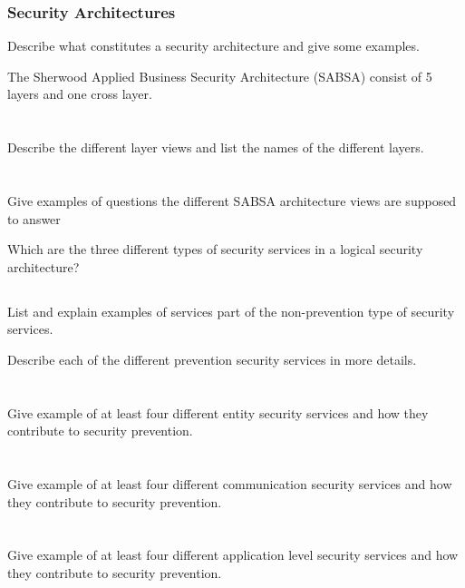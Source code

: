 \section{Security Architectures}\label{sec:Security_Architectures}
\begin{questions}
\item Describe what constitutes a security architecture and give some examples.
\item The Sherwood Applied Business Security Architecture (SABSA) consist of 5 layers and one cross layer.
  \begin{parts}
  \part{} Describe the different layer views and list the names of the different layers.
  \part{} Give examples of questions the different SABSA architecture views are supposed to answer
  \end{parts}

\item Which are the three different types of security services in a logical security architecture?
  \begin{parts}
  \part{} List and explain examples of services part of the non-prevention type of security services.
  \end{parts}

\item Describe each of the different prevention security services in more details.
  \begin{parts}
  \part{} Give example of at least four different entity security services and how they contribute to security prevention.
  \part{} Give example of at least four different communication security services and how they contribute to security prevention.
  \part{} Give example of at least four different application level security services and how they contribute to security prevention.

\end{parts}
\end{questions}

